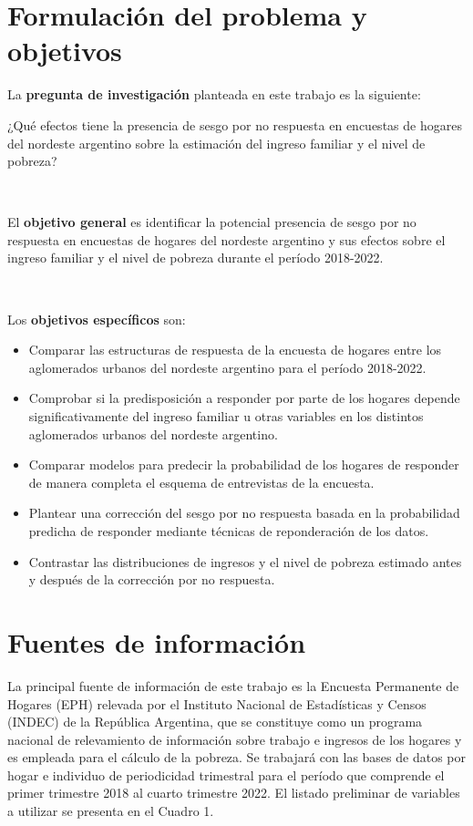 \documentclass{article}
\begin{document}
\section{Formulación del problema y objetivos}

La \textbf{pregunta de investigación} planteada en este trabajo es la siguiente:

¿Qué efectos tiene la presencia de sesgo por no respuesta en encuestas de hogares del nordeste argentino sobre la estimación del ingreso familiar y el nivel de pobreza?

\

El \textbf{objetivo general} es identificar la potencial presencia de sesgo por no respuesta en encuestas de hogares del nordeste argentino y sus efectos sobre el ingreso familiar y el nivel de pobreza durante el período 2018-2022.

\

Los \textbf{objetivos específicos} son:

\begin{itemize}
    \item Comparar las estructuras de respuesta de la encuesta de hogares entre los aglomerados urbanos del nordeste argentino para el período 2018-2022.
    \item Comprobar si la predisposición a responder por parte de los hogares depende significativamente del ingreso familiar u otras variables en los distintos aglomerados urbanos del nordeste argentino.
    \item Comparar modelos para predecir la probabilidad de los hogares de responder de manera completa el esquema de entrevistas de la encuesta.
    \item Plantear una corrección del sesgo por no respuesta basada en la probabilidad predicha de responder mediante técnicas de reponderación de los datos.
    \item Contrastar las distribuciones de ingresos y el nivel de pobreza estimado antes y después de la corrección por no respuesta.
\end{itemize}

\section{Fuentes de información}

La principal fuente de información de este trabajo es la Encuesta Permanente de Hogares (EPH) relevada por el Instituto Nacional de Estadísticas y Censos (INDEC) de la República Argentina, que se constituye como un programa nacional de relevamiento de información sobre trabajo e ingresos de los hogares y es empleada para el cálculo de la pobreza. Se trabajará con las bases de datos por hogar e individuo de periodicidad trimestral para el período que comprende el primer trimestre 2018 al cuarto trimestre 2022. El listado preliminar de variables a utilizar se presenta en el Cuadro 1.
\end{document}
